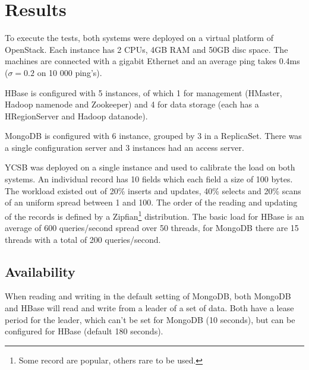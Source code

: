 \documentclass[10pt,conference,letterpaper]{IEEEtran}
\begin{document}
\section{Results}\label{sec:result}
To execute the tests, both systems were deployed on a virtual platform of OpenStack. Each instance has 2 CPUs, 4GB RAM and 50GB disc space. The machines are connected with a gigabit Ethernet and an average ping takes 0.4ms ($\sigma = 0.2$ on 10 000 ping's).

HBase is configured with 5 instances, of which 1 for management (HMaster, Hadoop namenode and Zookeeper) and 4 for data storage (each has a HRegionServer and Hadoop datanode). 

MongoDB is configured with 6 instance, grouped by 3 in a ReplicaSet. There was a single configuration server and 3 instances had an access server. 

YCSB was deployed on a single instance and used to calibrate the load on both systems. An individual record has 10 fields which each field a size of 100 bytes. The workload existed out of 20\% inserts and updates, 40\% selects and 20\% scans of an uniform spread between 1 and 100. The order of the reading and updating of the records is defined by a Zipfian\footnote{Some record are popular, others rare to be used.} distribution. The basic load for HBase is an average of 600 queries/second spread over 50 threads, for MongoDB there are 15 threads with a total of 200 queries/second. 

\subsection{Availability}
When reading and writing in the default setting of MongoDB, both MongoDB and HBase will read and write from a leader of a set of data. Both have a lease period for the leader, which can't be set for MongoDB (10 seconds), but can be configured for HBase (default 180 seconds). 
\end{document}

